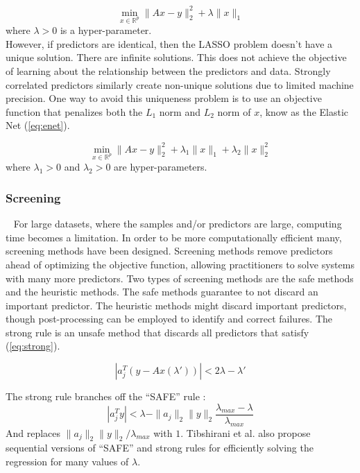 \documentclass{article}
\begin{document}
\begin{equation} \label{eq:lasso}
\min_{x\in \mathbb{R}^p} \|Ax-y\|_2^2 + \lambda \|x\|_1
\end{equation}
where $\lambda>0$ is a hyper-parameter.\\

However, if predictors are identical, then the LASSO problem doesn't have a unique solution. There are infinite solutions. This does not achieve the objective of learning about the relationship between the predictors and data. Strongly correlated predictors similarly create non-unique solutions due to limited machine precision. One way to avoid this uniqueness problem is to use an objective function that penalizes both the $L_1$ norm and $L_2$ norm of $x$, know as the Elastic Net (\ref{eq:enet}).

\begin{equation} \label{eq:enet}
\min_{x\in \mathbb{R}^p} \|Ax-y\|_2^2 + \lambda_1 \|x\|_1 + \lambda_2 \|x\|_2^2
\end{equation}
where $\lambda_1>0$ and $\lambda_2>0$ are hyper-parameters.\\

\subsubsection*{Screening}
\qquad ~ For large datasets, where the samples and/or predictors are large, computing time becomes a limitation. In order to be more computationally efficient many, screening methods have been designed. Screening methods remove predictors ahead of optimizing the objective function, allowing practitioners to solve systems with many more predictors. Two types of screening methods are the safe methods and the heuristic methods. The safe methods guarantee to not discard an important predictor. The heuristic methods might discard important predictors, though post-processing can be employed to identify and correct failures. The strong rule \cite{strong} is an unsafe method that discards all predictors that satisfy (\ref{eq:strong}). 

\begin{equation} \label{eq:strong}
|a_j^T (y - Ax(\lambda'))| < 2\lambda - \lambda'
\end{equation}

The strong rule branches off the ``SAFE'' rule \cite{safe}:
$$ |a_j^T y| < \lambda - \|a_j\|_2 \|y\|_2 \frac{\lambda_{max}-\lambda}{\lambda_{max}} $$
And replaces $\|a_j\|_2 \|y\|_2/\lambda_{max}$ with $1$. Tibshirani et al. also propose sequential versions of ``SAFE'' and strong rules for efficiently solving the regression for many values of $\lambda$.
\end{document}
